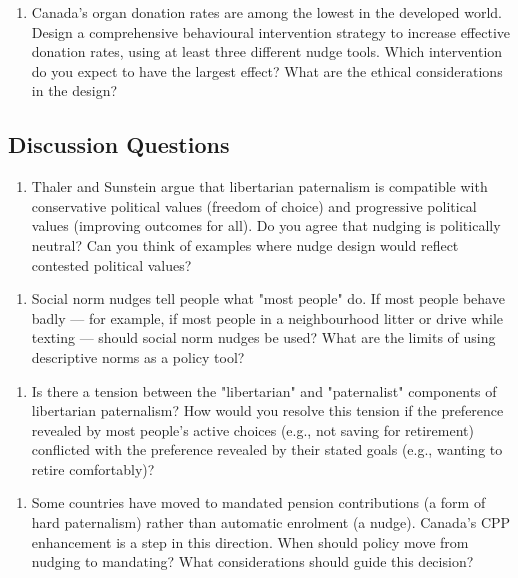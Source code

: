 \documentclass[12pt, letterpaper]{article}
\begin{document}
\begin{enumerate}
\item Canada's organ donation rates are among the lowest in the developed world. Design a comprehensive behavioural intervention strategy to increase effective donation rates, using at least three different nudge tools. Which intervention do you expect to have the largest effect? What are the ethical considerations in the design?
\end{enumerate}


\subsection{Discussion Questions}


\begin{enumerate}
\item Thaler and Sunstein argue that libertarian paternalism is compatible with conservative political values (freedom of choice) and progressive political values (improving outcomes for all). Do you agree that nudging is politically neutral? Can you think of examples where nudge design would reflect contested political values?
\end{enumerate}

\begin{enumerate}
\item Social norm nudges tell people what "most people" do. If most people behave badly --- for example, if most people in a neighbourhood litter or drive while texting --- should social norm nudges be used? What are the limits of using descriptive norms as a policy tool?
\end{enumerate}

\begin{enumerate}
\item Is there a tension between the "libertarian" and "paternalist" components of libertarian paternalism? How would you resolve this tension if the preference revealed by most people's active choices (e.g., not saving for retirement) conflicted with the preference revealed by their stated goals (e.g., wanting to retire comfortably)?
\end{enumerate}

\begin{enumerate}
\item Some countries have moved to mandated pension contributions (a form of hard paternalism) rather than automatic enrolment (a nudge). Canada's CPP enhancement is a step in this direction. When should policy move from nudging to mandating? What considerations should guide this decision?
\end{enumerate}
\end{document}
